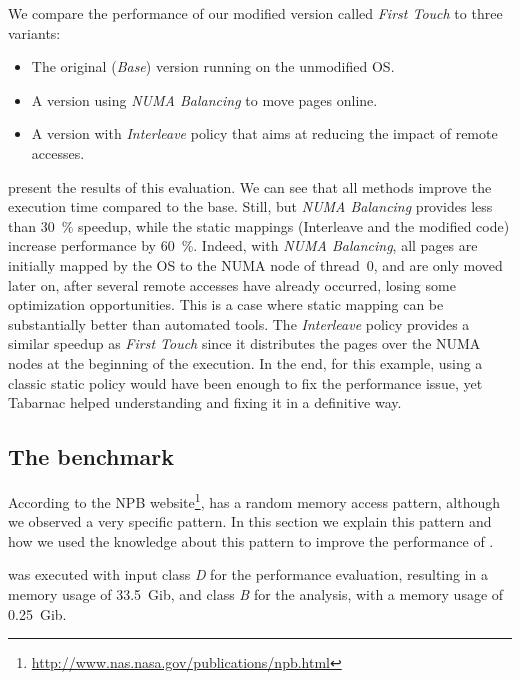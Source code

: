 We compare the performance of our modified version called \emph{First Touch} to three variants:
\begin{itemize}
    \item The original (\emph{Base}) version running on the unmodified \gls{OS}.
    \item A version using \emph{NUMA Balancing} to move pages online.
    \item A version with \emph{Interleave} policy that aims at reducing the impact of remote accesses.
\end{itemize}
 present the results of this evaluation.
We can see that all methods improve the execution time compared to the base.
Still, but \emph{NUMA Balancing} provides less than \SI{30}{\%} speedup, while the static mappings (Interleave and the modified code) increase performance by \SI{60}{\%}.
Indeed, with \emph{NUMA Balancing}, all pages are initially mapped by the \gls{OS} to the \gls{NUMA} node of thread~$0$, and are only moved later on, after several remote accesses have already occurred, losing some optimization opportunities.
This is a case where static mapping can be substantially better than automated tools.
The \emph{Interleave} policy provides a similar speedup as \emph{First Touch} since it distributes the pages over the \gls{NUMA} nodes at the beginning of the execution.
In the end, for this example, using a classic static policy would have been enough to fix the performance issue, yet \gls{Tabarnac} helped understanding and fixing it in a definitive way.

\subsection{The \IS benchmark}
\label{sec:tab-is}

According to the \gls{NPB} website\footnote{\url{http://www.nas.nasa.gov/publications/npb.html}}, \IS has a random memory access pattern, although we observed a very specific pattern.
In this section we explain this pattern and how we used the knowledge about this pattern to improve the performance of \IS.

\IS was executed with input class \emph{D} for the performance evaluation, resulting in a memory usage of \SI{33.5}{Gib}, and class \emph{B} for the analysis, with a memory usage of \SI{0.25}{Gib}.


